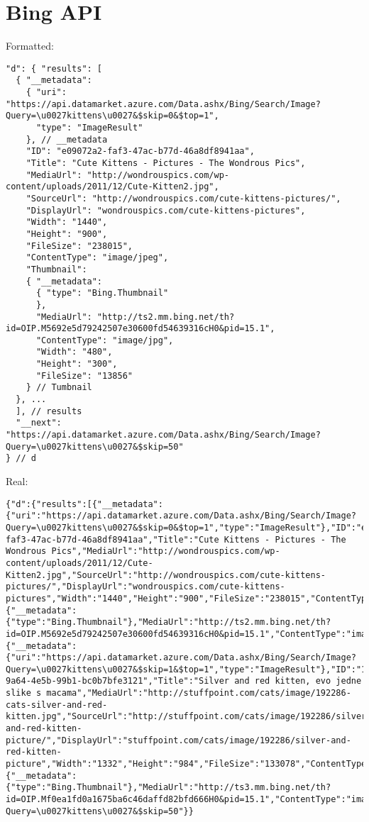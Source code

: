 \section{Bing API}

Formatted:
\begin{verbatim}
"d": { "results": [
  { "__metadata":
    { "uri": "https://api.datamarket.azure.com/Data.ashx/Bing/Search/Image?Query=\u0027kittens\u0027&$skip=0&$top=1",
      "type": "ImageResult"
    }, // __metadata
    "ID": "e09072a2-faf3-47ac-b77d-46a8df8941aa",
    "Title": "Cute Kittens - Pictures - The Wondrous Pics",
    "MediaUrl": "http://wondrouspics.com/wp-content/uploads/2011/12/Cute-Kitten2.jpg",
    "SourceUrl": "http://wondrouspics.com/cute-kittens-pictures/",
    "DisplayUrl": "wondrouspics.com/cute-kittens-pictures",
    "Width": "1440",
    "Height": "900",
    "FileSize": "238015",
    "ContentType": "image/jpeg",
    "Thumbnail":
    { "__metadata":
      { "type": "Bing.Thumbnail"
      },
      "MediaUrl": "http://ts2.mm.bing.net/th?id=OIP.M5692e5d79242507e30600fd54639316cH0&pid=15.1",
      "ContentType": "image/jpg",
      "Width": "480",
      "Height": "300",
      "FileSize": "13856"
    } // Tumbnail
  }, ...
  ], // results
  "__next": "https://api.datamarket.azure.com/Data.ashx/Bing/Search/Image?Query=\u0027kittens\u0027&$skip=50"
} // d
\end{verbatim}

Real:
\begin{verbatim}
{"d":{"results":[{"__metadata":{"uri":"https://api.datamarket.azure.com/Data.ashx/Bing/Search/Image?Query=\u0027kittens\u0027&$skip=0&$top=1","type":"ImageResult"},"ID":"e09072a2-faf3-47ac-b77d-46a8df8941aa","Title":"Cute Kittens - Pictures - The Wondrous Pics","MediaUrl":"http://wondrouspics.com/wp-content/uploads/2011/12/Cute-Kitten2.jpg","SourceUrl":"http://wondrouspics.com/cute-kittens-pictures/","DisplayUrl":"wondrouspics.com/cute-kittens-pictures","Width":"1440","Height":"900","FileSize":"238015","ContentType":"image/jpeg","Thumbnail":{"__metadata":{"type":"Bing.Thumbnail"},"MediaUrl":"http://ts2.mm.bing.net/th?id=OIP.M5692e5d79242507e30600fd54639316cH0&pid=15.1","ContentType":"image/jpg","Width":"480","Height":"300","FileSize":"13856"}},{"__metadata":{"uri":"https://api.datamarket.azure.com/Data.ashx/Bing/Search/Image?Query=\u0027kittens\u0027&$skip=1&$top=1","type":"ImageResult"},"ID":"16f74e1b-9a64-4e5b-99b1-bc0b7bfe3121","Title":"Silver and red kitten, evo jedne slike s macama","MediaUrl":"http://stuffpoint.com/cats/image/192286-cats-silver-and-red-kitten.jpg","SourceUrl":"http://stuffpoint.com/cats/image/192286/silver-and-red-kitten-picture/","DisplayUrl":"stuffpoint.com/cats/image/192286/silver-and-red-kitten-picture","Width":"1332","Height":"984","FileSize":"133078","ContentType":"image/jpeg","Thumbnail":{"__metadata":{"type":"Bing.Thumbnail"},"MediaUrl":"http://ts3.mm.bing.net/th?id=OIP.Mf0ea1fd0a1675ba6c46daffd82bfd666H0&pid=15.1","ContentType":"image/jpg","Width":"300","Height":"221","FileSize":"6509"}},...],"__next":"https://api.datamarket.azure.com/Data.ashx/Bing/Search/Image?Query=\u0027kittens\u0027&$skip=50"}}
\end{verbatim}



